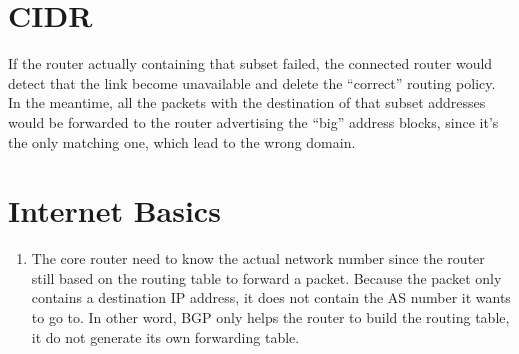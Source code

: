 \documentclass[12pt,titlepage,letterpaper]{article}
\begin{document}
\section{CIDR}
If the router actually containing that subset failed, the connected router
would detect that the link become unavailable and delete the ``correct''
routing policy. In the meantime, all the packets with the destination of that
subset addresses would be forwarded to the router advertising the ``big''
address blocks, since it's the only matching one, which lead to the wrong
domain.

\section{Internet Basics}
\begin{enumerate}[label=\bfseries\alph*)]
    \item The core router need to know the actual network number since the
        router still based on the routing table to forward a packet. Because
        the packet only contains a destination IP address, it does not contain
        the AS number it wants to go to. In other word, BGP only helps the
        router to build the routing table, it do not generate its own
        forwarding table.
\end{enumerate}
\end{document}
